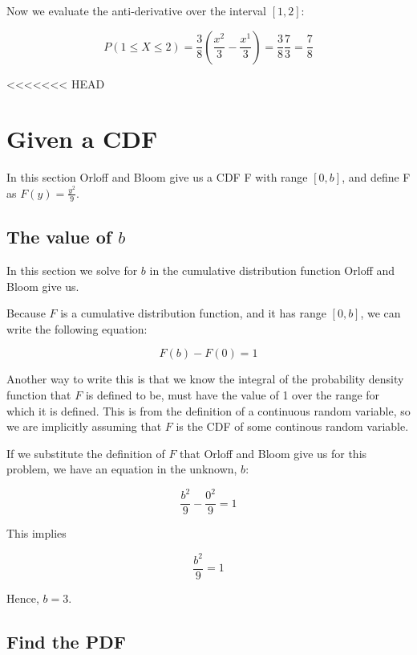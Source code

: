 \documentclass[a4paper,11pt]{article}
\begin{document}
Now we evaluate the anti-derivative over the interval $\left[ 1, 2 \right]$:

\begin{equation}
P \left( 1 \leq X \leq 2 \right)
  = \frac{3}{8} \left( \frac{x^{2}}{3} - \frac{x^{1}}{3} \right)
  = \frac{3}{8} \frac{7}{3}
  = \frac{7}{8}
\end{equation}

<<<<<<< HEAD
\section{Given a CDF}

In this section Orloff and Bloom give us a CDF F with range
$\left[ 0, b \right]$, and define F as $F\left( y \right) = \frac{y^{2}}{9}$.

\subsection{The value of $b$}

In this section we solve for $b$ in the cumulative distribution function Orloff
and Bloom give us.

Because $F$ is a cumulative distribution function, and it has range
$\left[ 0, b \right]$, we can write the following equation:

\begin{equation}
    F \left(b \right) - F\left(0 \right) = 1
\end{equation}

Another way to write this is that we know the integral of the probability
density function that $F$ is defined to be, must have the value of 1 over
the range for which it is defined.  This is from the definition of a continuous
random variable, so we are implicitly assuming that $F$ is the CDF of some
continous random variable.

If we substitute the definition of $F$ that Orloff and Bloom give us for this
problem, we have an equation in the unknown, $b$:

\begin{equation}
  \frac{b^{2}}{9} - \frac{0^{2}}{9} = 1
\end{equation}

This implies


\begin{equation}
  \frac{b^{2}}{9} = 1
\end{equation}

Hence, $b = 3$.

\subsection{Find the PDF}
\end{document}
